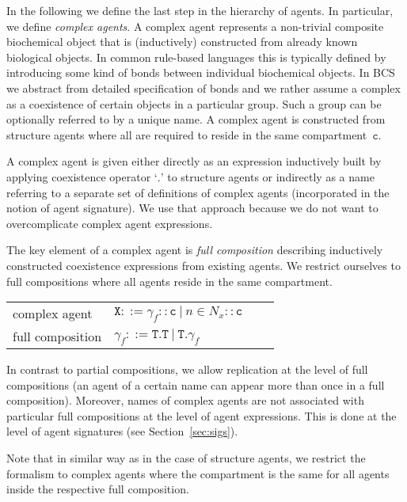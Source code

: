 \documentclass{entcs}
\renewcommand{\~}[0]{\texttildelow}
\newcommand{\choice}{|}
\begin{document}
In the following we define the last step in the hierarchy of agents. In particular, we define \textit{complex agents}. A complex agent represents a non-trivial composite biochemical object that is (inductively) constructed from already known biological objects. In common rule-based languages this is typically defined by introducing some kind of bonds between individual biochemical objects. In BCS we abstract from detailed specification of bonds and we rather assume a complex as a coexistence of certain objects in a particular group. Such a group can be optionally referred to by a unique name. A complex agent is constructed from structure agents where all are required to reside in the same compartment~$\mathtt{c}$. 

A complex agent is given either directly as an expression inductively built by applying coexistence operator `$.$' to structure agents or indirectly as a name referring to a separate set of definitions of complex agents (incorporated in the notion of agent signature). We use that approach because we do not want to overcomplicate complex agent expressions. 

The key element of a complex agent is \emph{full composition} describing inductively constructed coexistence expressions from existing agents. We restrict ourselves to full compositions where all agents reside in the same compartment.

\begin{center}
{\small
\hspace*{-1cm}\begin{tabular}{ ll ll }
 complex agent & $\mathtt{X}::=\gamma_f::\mathtt{c}~\choice~n\in{N}_{x}::\mathtt{c}$\\
 full composition & $\gamma_f ::= \mathtt{T}.\mathtt{T}~\choice~\mathtt{T}.\gamma_f$\\
\end{tabular}
}
\end{center}

In contrast to partial compositions, we allow replication at the level of full compositions (an agent of a certain name can appear more than once in a full composition). Moreover, names of complex agents are not associated with particular full compositions at the level of agent expressions. This is done at the level of agent signatures (see Section~\ref{sec:sigs}).

Note that in similar way as in the case of structure agents, we restrict the formalism to complex agents where the compartment is the same for all agents inside the respective full composition.
\end{document}
